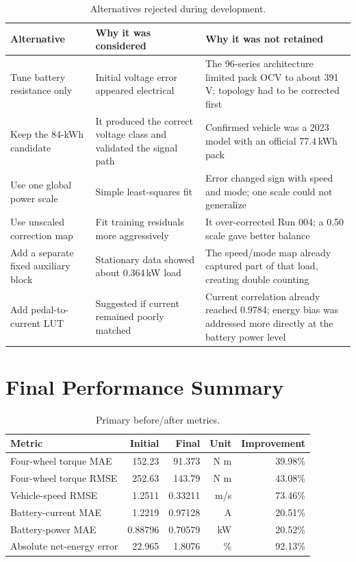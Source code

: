 \documentclass[11pt,letterpaper]{article}
\newcommand{\SI}[2]{#1\,#2}
\begin{document}
\begin{table}[H]
\centering
\caption{Alternatives rejected during development.}
\begin{tabularx}{\textwidth}{p{}Y Y}
\toprule
Alternative & Why it was considered & Why it was not retained \\
\midrule
Tune battery resistance only & Initial voltage error appeared electrical & The 96-series architecture limited pack OCV to about \SI{391}{V}; topology had to be corrected first \\
Keep the 84-kWh candidate & It produced the correct voltage class and validated the signal path & Confirmed vehicle was a 2023 model with an official \SI{77.4}{kWh} pack \\
Use one global power scale & Simple least-squares fit & Error changed sign with speed and mode; one scale could not generalize \\
Use unscaled correction map & Fit training residuals more aggressively & It over-corrected Run 004; a 0.50 scale gave better balance \\
Add a separate fixed auxiliary block & Stationary data showed about \SI{0.364}{kW} load & The speed/mode map already captured part of that load, creating double counting \\
Add pedal-to-current LUT & Suggested if current remained poorly matched & Current correlation already reached 0.9784; energy bias was addressed more directly at the battery power level \\
\bottomrule
\end{tabularx}
\end{table}

\section{Final Performance Summary}

\begin{table}[H]
\centering
\caption{Primary before/after metrics.}
\begin{tabular}{lrrrr}
\toprule
Metric & Initial & Final & Unit & Improvement \\
\midrule
Four-wheel torque MAE & 152.23 & 91.373 & N m & 39.98\% \\
Four-wheel torque RMSE & 252.63 & 143.79 & N m & 43.08\% \\
Vehicle-speed RMSE & 1.2511 & 0.33211 & m/s & 73.46\% \\
Battery-current MAE & 1.2219 & 0.97128 & A & 20.51\% \\
Battery-power MAE & 0.88796 & 0.70579 & kW & 20.52\% \\
Absolute net-energy error & 22.965 & 1.8076 & \% & 92.13\% \\
\bottomrule
\end{tabular}
\end{table}
\end{document}
